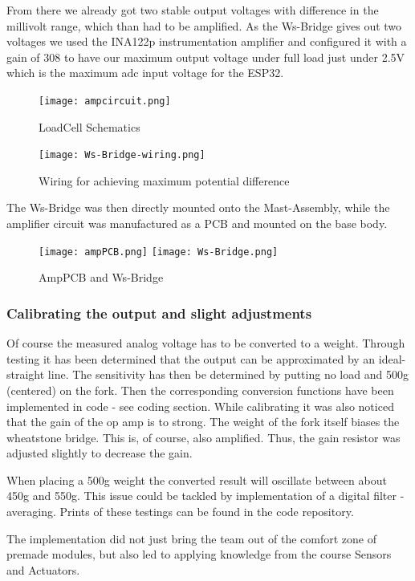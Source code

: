 \documentclass[../report.tex]{subfiles}
\begin{document}
From there we already got two stable output voltages with difference in the millivolt range, 
which than had to be amplified.
As the Ws-Bridge gives out two voltages we used the INA122p instrumentation amplifier and 
configured it with a gain of 308 to have our maximum output voltage under full load just 
under 2.5V which is the maximum adc input voltage for the ESP32.

\begin{figure}[H]
  \centering
  \texttt{[image: ampcircuit.png]}
  \caption{LoadCell Schematics}
\end{figure} 
\begin{figure}[H]
  \centering
  \texttt{[image: Ws-Bridge-wiring.png]}
  \caption{Wiring for achieving maximum potential difference}
\end{figure}

The Ws-Bridge was then directly mounted onto the Mast-Assembly, while the amplifier circuit 
was manufactured as a PCB and mounted on the base body.

\begin{figure}[H]
  \centering
  \texttt{[image: ampPCB.png]}
  \texttt{[image: Ws-Bridge.png]}
  \caption{AmpPCB and Ws-Bridge}
\end{figure} 

\subsubsection{Calibrating the output and slight adjustments}
Of course the measured analog voltage has to be converted to a weight.
Through testing it has been determined that the output can be approximated
by an ideal-straight line. The sensitivity has then be determined by putting no load
and 500g (centered) on the fork. Then the corresponding conversion functions have been 
implemented in code - see coding section.
While calibrating it was also noticed that the gain of the op amp is to strong.
The weight of the fork itself biases the wheatstone bridge. This is, of course, also amplified.
Thus, the gain resistor was adjusted slightly to decrease the gain.

\quad
When placing a 500g weight the converted result will oscillate between about 450g and 550g.
This issue could be tackled by implementation of a digital filter - averaging. Prints of these testings
can be found in the code repository.
\quad

The implementation did not just bring the team out of the comfort zone of premade modules, but
also led to applying knowledge from the course Sensors and Actuators.
\end{document}
